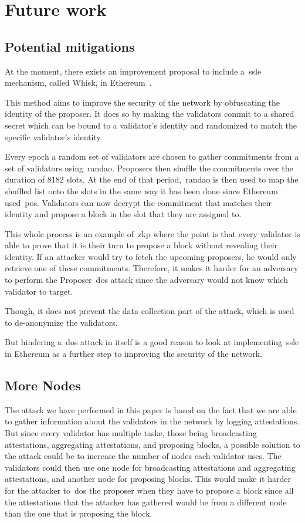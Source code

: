

\section{Future work}\label{sec:future-works}

\subsection{Potential mitigations}\label{subsec:potential-mitigations}
At the moment, there exists an improvement proposal
to include a~\gls{ssle} mechanism, called Whisk, in Ethereum~\cite{EthereumResearchSSLE2024}.

This method aims to improve the security of the network by obfuscating the identity of the proposer.
It does so by making the validators commit to a shared secret which can be bound to a validator's identity and randomized to match the specific validator's identity.

Every epoch a random set of validators are chosen to gather commitments from a set of validators using~\gls{randao}.
Proposers then shuffle the commitments over the duration of 8182 slots.
At the end of that period,~\gls{randao} is then used to map the shuffled list onto the slots in the same way it has been done since Ethereum used~\gls{pos}.
Validators can now decrypt the commitment that matches their identity and propose a block in the slot that they are assigned to.

This whole process is an example of~\gls{zkp} where the point is that every validator is able to prove that it is their turn to propose a block without revealing their identity.
If an attacker would try to fetch the upcoming proposers, he would only retrieve one of these commitments.
Therefore, it makes it harder
for an adversary to perform the Proposer~\gls{dos} attack since the adversary would not know which validator to target.

Though, it does not prevent the data collection part of the attack, which is used to de-anonymize the validators.

But hindering a~\gls{dos} attack in itself is a good reason
to look at implementing~\gls{ssle} in Ethereum as a further step to improving the security of the network.


\subsection{More Nodes}\label{subsec:more-nodes}
The attack we have performed in this paper is based on the fact that we are able to gather information about the validators in the network by logging attestations.
But since every validator has multiple taske, those being broadcasting attestations, aggregating attestations, and proposing blocks, a possible solution to the attack could be to increase the number of nodes each validator uses.
The validators could then use one node for broadcasting attestations and aggregating attestations, and another node for proposing blocks.
This would make it harder for the attacker to~\gls{dos} the proposer when they have to propose a block since all the attestations that the attacker has gathered would be from a different node than the one that is proposing the block.

